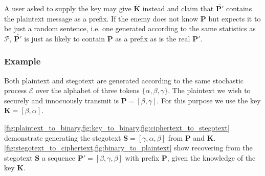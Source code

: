 \documentclass[draft]{IIBproject}
\makeatletter
\DeclareRobustCommand*{\ie}{i.e.\@\xspace}
\makeatother
\begin{document}
A user asked to supply the key may give $\mathbf {\overline K}$ instead and claim that $\mathbf {\overline {P'}}$ contains the plaintext message as a prefix. If the enemy does not know $\mathbf P$ but expects it to be just a random sentence, \ie one generated according to the same statistics as $\mathcal P$, $\mathbf {\overline {P'}}$ is just as likely to contain $\mathbf P$ as a prefix as is the real $\mathbf{P'}$.

\subsubsection{Example}
\label{sec:secure_stegosystem_example}

Both plaintext and stegotext are generated according to the same stochastic process $\mathcal E$ over the alphabet of three tokens $\{ \alpha, \beta, \gamma \}$. The plaintext we wish to securely and innocuously transmit is $\mathbf P = [\beta,\gamma]$. For this purpose we use the key $\mathbf K = [\beta,\alpha]$.

\cref{fig:plaintext_to_binary,fig:key_to_binary,fig:ciphertext_to_stegotext} demonstrate generating the stegotext $\mathbf S = [\gamma,\alpha,\beta]$ from $\mathbf P$ and $\mathbf K$. \cref{fig:stegotext_to_ciphertext,fig:binary_to_plaintext} show recovering from the stegotext $\mathbf S$ a sequence $\mathbf{P'} = [\beta,\gamma,\beta]$ with prefix $\mathbf P$, given the knowledge of the key $\mathbf K$.
\end{document}
